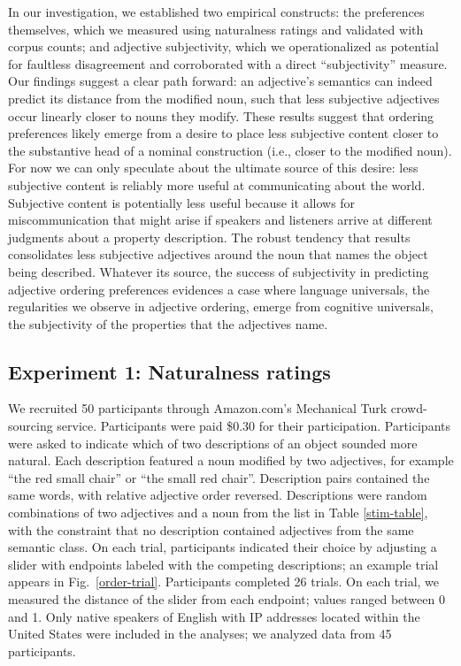 \documentclass{pnastwo}
\begin{document}
\begin{article}
In our investigation, we established two empirical constructs: the preferences themselves, which we measured using naturalness ratings and validated with corpus counts; and adjective subjectivity, which we operationalized as potential for faultless disagreement and corroborated with a direct ``subjectivity'' measure. Our findings suggest a clear path forward: an adjective's semantics can indeed predict its distance from the modified noun, such that less subjective adjectives occur linearly closer to nouns they modify. These results suggest that ordering preferences likely emerge from a desire to place less subjective content closer to the substantive head of a nominal construction (i.e., closer to the modified noun). For now we can only speculate about the ultimate source of this desire: less subjective content is reliably more useful at communicating about the world. Subjective content is potentially less useful because it allows for miscommunication that might arise if speakers and listeners arrive at different judgments about a property description. The robust tendency that results consolidates less subjective adjectives around the noun that names the object being described. Whatever its source, the success of subjectivity in predicting adjective ordering preferences evidences a case where language universals, the regularities we observe in adjective ordering, emerge from cognitive universals, the subjectivity of the properties that the adjectives name.

\begin{materials}
\section{Experiment 1: Naturalness ratings}	
We recruited 50 participants through Amazon.com's Mechanical Turk crowd-sourcing service. Participants were paid \$0.30 for their participation.
Participants were asked to indicate which of two descriptions of an object sounded more natural. Each description featured a noun modified by two adjectives, for example ``the red small chair'' or ``the small red chair''. Description pairs contained the same words, with relative adjective order reversed. Descriptions were random combinations of two adjectives and a noun from the list in Table \ref{stim-table}, with the constraint that no description contained adjectives from the same semantic class.
On each trial, participants indicated their choice by adjusting a slider with endpoints labeled with the competing descriptions; an example trial appears in Fig.\ \ref{order-trial}. Participants completed 26 trials. On each trial, we measured the distance of the slider from each endpoint; values ranged between 0 and 1. Only native speakers of English with IP addresses located within the United States were included in the analyses; we analyzed data from 45 participants.


\end{materials}
\end{article}
\end{document}
